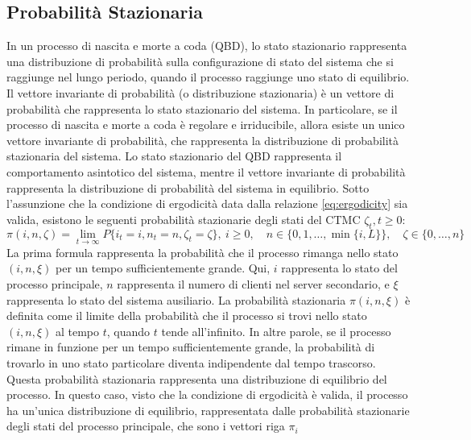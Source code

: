 \documentclass[11pt]{article}
\begin{document}
\subsection{Probabilità Stazionaria}

In un processo di nascita e morte a coda (QBD), lo stato stazionario rappresenta una distribuzione di probabilità sulla configurazione di stato del sistema che si raggiunge nel lungo periodo, quando il processo raggiunge uno stato di equilibrio. Il vettore invariante di probabilità (o distribuzione stazionaria) è un vettore di probabilità che rappresenta lo stato stazionario del sistema. In particolare, se il processo di nascita e morte a coda è regolare e irriducibile, allora esiste un unico vettore invariante di probabilità, che rappresenta la distribuzione di probabilità stazionaria del sistema.  Lo stato stazionario del QBD rappresenta il comportamento asintotico del sistema, mentre il vettore invariante di probabilità rappresenta la distribuzione di probabilità del sistema in equilibrio. Sotto l'assunzione che la condizione di ergodicità data dalla relazione \ref{eq:ergodicity} sia valida, esistono le seguenti probabilità stazionarie degli stati del CTMC $\zeta_t, t \geq 0$:
\begin{equation}
    \pi(i,n,\zeta) = \lim_{t \to \infty} P\{i_t = i, n_t = n, \zeta_t = \zeta\}, ~ i \geq 0, \quad n \in \{0, 1, \dots , \min\{i,L\}\}, \quad \zeta \in \{0, \dots, n\}
\end{equation}
La prima formula rappresenta la probabilità che il processo rimanga nello stato $(i,n,\xi)$ per un tempo sufficientemente grande. Qui, $i$ rappresenta lo stato del processo principale, $n$ rappresenta il numero di clienti nel server secondario, e $\xi$ rappresenta lo stato del sistema ausiliario. La probabilità stazionaria $\pi(i,n,\xi)$ è definita come il limite della probabilità che il processo si trovi nello stato $(i,n,\xi)$ al tempo $t$, quando $t$ tende all'infinito. In altre parole, se il processo rimane in funzione per un tempo sufficientemente grande, la probabilità di trovarlo in uno stato particolare diventa indipendente dal tempo trascorso. Questa probabilità stazionaria rappresenta una distribuzione di equilibrio del processo. In questo caso, visto che la condizione di ergodicità è valida, il processo ha un'unica distribuzione di equilibrio, rappresentata dalle probabilità stazionarie degli stati del processo principale, che sono i vettori riga $\pi_i$ \\
\end{document}
